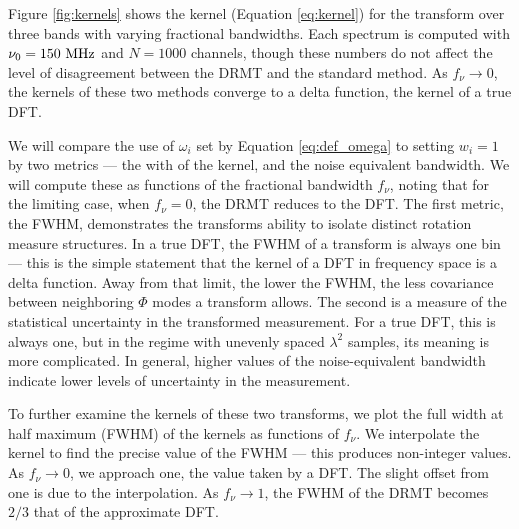 Figure \ref{fig:kernels} shows the kernel (Equation \ref{eq:kernel}) for the transform over three
bands with varying fractional bandwidths. Each spectrum is computed with $\nu_0 = 150\ {\rm MHz}$
and $N=1000$ channels, though these numbers do not affect the level of disagreement between the DRMT
and the standard method. As $f_\nu\to0$, the kernels of these two methods converge to a delta
function, the kernel of a true DFT.

We will compare the use of $\omega_i$ set by Equation \ref{eq:def_omega} to setting $w_i=1$ by 
two metrics --- the with of the kernel, and the noise equivalent bandwidth. We will compute these as
functions of the fractional bandwidth $f_\nu$, noting that for the limiting case, when $f_\nu=0$,
the DRMT reduces to the DFT. The first metric, the FWHM, demonstrates the transforms ability to
isolate distinct rotation measure structures. In a true DFT, the FWHM of a transform is always one
bin --- this is the simple statement that the kernel of a DFT in frequency space is a delta
function. Away from that limit, the lower the FWHM, the less covariance between neighboring $\Phi$
modes a transform allows. The second is a measure of the statistical uncertainty in the transformed 
measurement. For a true DFT, this is always one, but in the regime with unevenly spaced $\lambda^2$
samples, its meaning is more complicated. In general, higher values of the noise-equivalent
bandwidth indicate lower levels of uncertainty in the measurement. 

To further examine the kernels of these two transforms, we plot the full width at half maximum
(FWHM) of the kernels as functions of $f_\nu$. We interpolate the kernel to find the precise value
of the FWHM --- this produces non-integer values. As $f_\nu\to0$, we approach one, the value taken
by a DFT. The slight offset from one is due to the interpolation. As $f_\nu\to1$, the FWHM of the DRMT
becomes $2/3$ that of the approximate DFT. 

